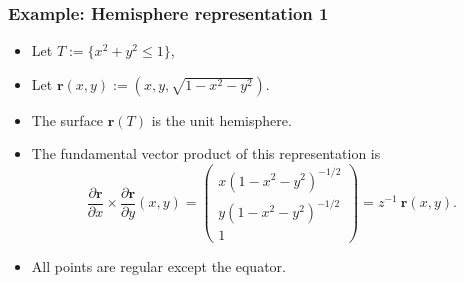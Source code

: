 \documentclass[aspectratio=169]{beamer}
\newcommand{\rr}{\mathbf{r}}
\newcommand{\cover}[1]{{#1}}
\begin{document}
\begin{frame}
    \frametitle{Example: Hemisphere representation 1}


    \begin{itemize}
        \item     Let \( T:=\{x^2+y^2 \leq 1\}\),
        \item Let
              \(\rr(x,y):=(x,y,\sqrt{1-x^2 -y^2})\).
        \item The surface \(\rr(T)\) is the unit hemisphere.
        \item The fundamental vector product of this representation is
              \[
                  \frac{\partial \rr}{\partial x} \times \frac{\partial \rr}{\partial y}(x,y)
                  =
                  \left(\begin{smallmatrix}
                          \cover{x (1-x^2-y^2)^{-1/2}} \\ \cover{y (1-x^2-y^2)^{-1/2}}  \\ \cover{ 1}
                      \end{smallmatrix}\right)
                  = \cover{z^{-1}} \ \rr(x,y).
              \]
        \item All points are regular except the equator.
    \end{itemize}

\end{frame}
\end{document}
